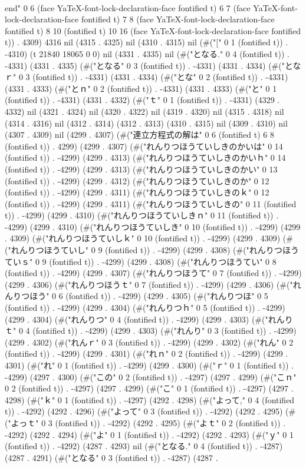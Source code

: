  \\end{}" 0 6 (face YaTeX-font-lock-declaration-face fontified t) 6 7 (face YaTeX-font-lock-declaration-face fontified t) 7 8 (face YaTeX-font-lock-declaration-face fontified t) 8 10 (fontified t) 10 16 (face YaTeX-font-lock-declaration-face fontified t)) . 4309) 4316 nil (4315 . 4325) nil (4310 . 4315) nil (#("[" 0 1 (fontified t)) . -4310) (t 21840 18065 0 0) nil (4331 . 4335) nil (#("となる." 0 4 (fontified t)) . -4331) (4331 . 4335) (#("となる" 0 3 (fontified t)) . -4331) (4331 . 4334) (#("となｒ" 0 3 (fontified t)) . -4331) (4331 . 4334) (#("とな" 0 2 (fontified t)) . -4331) (4331 . 4333) (#("とｎ" 0 2 (fontified t)) . -4331) (4331 . 4333) (#("と" 0 1 (fontified t)) . -4331) (4331 . 4332) (#("ｔ" 0 1 (fontified t)) . -4331) (4329 . 4332) nil (4321 . 4324) nil (4320 . 4322) nil (4319 . 4320) nil (4315 . 4318) nil (4314 . 4316) nil (4312 . 4314) (4312 . 4313) (4310 . 4315) nil (4309 . 4310) nil (4307 . 4309) nil (4299 . 4307) (#("連立方程式の解は" 0 6 (fontified t) 6 8 (fontified t)) . 4299) (4299 . 4307) (#("れんりつほうていしきのかいは" 0 14 (fontified t)) . -4299) (4299 . 4313) (#("れんりつほうていしきのかいｈ" 0 14 (fontified t)) . -4299) (4299 . 4313) (#("れんりつほうていしきのかい" 0 13 (fontified t)) . -4299) (4299 . 4312) (#("れんりつほうていしきのか" 0 12 (fontified t)) . -4299) (4299 . 4311) (#("れんりつほうていしきのｋ" 0 12 (fontified t)) . -4299) (4299 . 4311) (#("れんりつほうていしきの" 0 11 (fontified t)) . -4299) (4299 . 4310) (#("れんりつほうていしきｎ" 0 11 (fontified t)) . -4299) (4299 . 4310) (#("れんりつほうていしき" 0 10 (fontified t)) . -4299) (4299 . 4309) (#("れんりつほうていしｋ" 0 10 (fontified t)) . -4299) (4299 . 4309) (#("れんりつほうていし" 0 9 (fontified t)) . -4299) (4299 . 4308) (#("れんりつほうていｓ" 0 9 (fontified t)) . -4299) (4299 . 4308) (#("れんりつほうてい" 0 8 (fontified t)) . -4299) (4299 . 4307) (#("れんりつほうて" 0 7 (fontified t)) . -4299) (4299 . 4306) (#("れんりつほうｔ" 0 7 (fontified t)) . -4299) (4299 . 4306) (#("れんりつほう" 0 6 (fontified t)) . -4299) (4299 . 4305) (#("れんりつほ" 0 5 (fontified t)) . -4299) (4299 . 4304) (#("れんりつｈ" 0 5 (fontified t)) . -4299) (4299 . 4304) (#("れんりつ" 0 4 (fontified t)) . -4299) (4299 . 4303) (#("れんりｔ" 0 4 (fontified t)) . -4299) (4299 . 4303) (#("れんり" 0 3 (fontified t)) . -4299) (4299 . 4302) (#("れんｒ" 0 3 (fontified t)) . -4299) (4299 . 4302) (#("れん" 0 2 (fontified t)) . -4299) (4299 . 4301) (#("れｎ" 0 2 (fontified t)) . -4299) (4299 . 4301) (#("れ" 0 1 (fontified t)) . -4299) (4299 . 4300) (#("ｒ" 0 1 (fontified t)) . -4299) (4297 . 4300) (#("この" 0 2 (fontified t)) . -4297) (4297 . 4299) (#("こｎ" 0 2 (fontified t)) . -4297) (4297 . 4299) (#("こ" 0 1 (fontified t)) . -4297) (4297 . 4298) (#("ｋ" 0 1 (fontified t)) . -4297) (4292 . 4298) (#("よって," 0 4 (fontified t)) . -4292) (4292 . 4296) (#("よって" 0 3 (fontified t)) . -4292) (4292 . 4295) (#("よっｔ" 0 3 (fontified t)) . -4292) (4292 . 4295) (#("よｔ" 0 2 (fontified t)) . -4292) (4292 . 4294) (#("よ" 0 1 (fontified t)) . -4292) (4292 . 4293) (#("ｙ" 0 1 (fontified t)) . -4292) (4287 . 4293) nil (#("となる." 0 4 (fontified t)) . -4287) (4287 . 4291) (#("となる" 0 3 (fontified t)) . -4287) (4287 . 